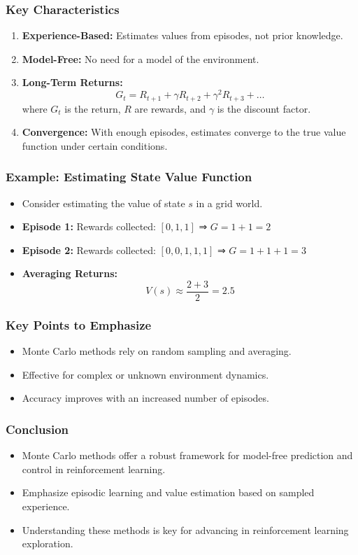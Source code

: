 \documentclass[aspectratio=169]{beamer}
\begin{document}
\begin{frame}[fragile]
  \frametitle{Key Characteristics}
  \begin{enumerate}
    \item \textbf{Experience-Based:} Estimates values from episodes, not prior knowledge.
    \item \textbf{Model-Free:} No need for a model of the environment.
    \item \textbf{Long-Term Returns:} 
      \begin{equation}
      G_t = R_{t+1} + \gamma R_{t+2} + \gamma^2 R_{t+3} + \ldots
      \end{equation}
      where \( G_t \) is the return, \( R \) are rewards, and \( \gamma \) is the discount factor.
    \item \textbf{Convergence:} With enough episodes, estimates converge to the true value function under certain conditions.
  \end{enumerate}
\end{frame}

\begin{frame}[fragile]
  \frametitle{Example: Estimating State Value Function}
  \begin{itemize}
    \item Consider estimating the value of state \( s \) in a grid world.
    \item \textbf{Episode 1:} Rewards collected: \([0, 1, 1]\) ⇒ \( G = 1 + 1 = 2 \)
    \item \textbf{Episode 2:} Rewards collected: \([0, 0, 1, 1, 1]\) ⇒ \( G = 1 + 1 + 1 = 3 \)
    \item \textbf{Averaging Returns:}
      \[
      V(s) \approx \frac{2 + 3}{2} = 2.5
      \]
  \end{itemize}
\end{frame}

\begin{frame}[fragile]
  \frametitle{Key Points to Emphasize}
  \begin{itemize}
    \item Monte Carlo methods rely on random sampling and averaging.
    \item Effective for complex or unknown environment dynamics.
    \item Accuracy improves with an increased number of episodes.
  \end{itemize}
\end{frame}

\begin{frame}[fragile]
  \frametitle{Conclusion}
  \begin{itemize}
    \item Monte Carlo methods offer a robust framework for model-free prediction and control in reinforcement learning.
    \item Emphasize episodic learning and value estimation based on sampled experience.
    \item Understanding these methods is key for advancing in reinforcement learning exploration.
  \end{itemize}
\end{frame}
\end{document}
